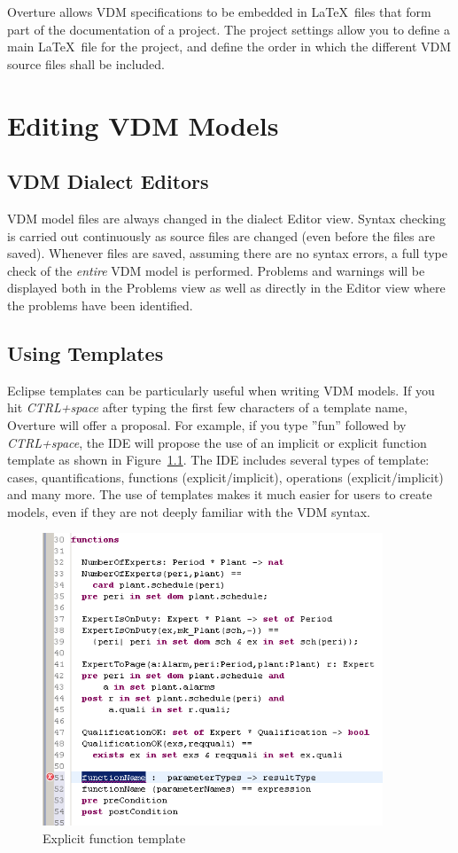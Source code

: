 \documentclass{overturerepchap}
\begin{document}
Overture allows VDM specifications to be embedded in \LaTeX\ files that
form part of the documentation of a project. The project settings allow you
to define a main \LaTeX\ file for the project, and define the order in which the
different VDM source files shall be included.

\chapter{Editing VDM Models}\label{sec:editVDM}

\section{VDM Dialect Editors}

VDM model files are always changed in the dialect Editor view. Syntax checking
is carried out continuously as source files are
changed (even before the files are saved). Whenever files are saved, assuming
there are no syntax errors, a full type check of the \emph{entire} VDM model is
performed.
Problems and warnings will be displayed both in the Problems view as well as
directly in the Editor view where the problems have been identified.


\section{Using Templates}

Eclipse templates can be particularly useful when writing VDM models. If you
hit \textit{CTRL+space} after typing the first few characters of a template name,
Overture will offer a proposal. For example, if you type ''fun'' followed
by \textit{CTRL+space}, the IDE will propose the use of an implicit or explicit
function template as shown in Figure~\ref{fig:functionTemplate}. The IDE includes
several types of template: cases, quantifications, functions (explicit/implicit),
operations (explicit/implicit) and many more. The use of templates makes it much
easier for users to create models, even if they are not deeply familiar
with the VDM syntax.

\begin{figure}
\begin{center}
\includegraphics[width=4in]{figures/FunctionTemplate}
\caption{Explicit function template}
\label{fig:functionTemplate}
\end{center}
\end{figure}
\end{document}
